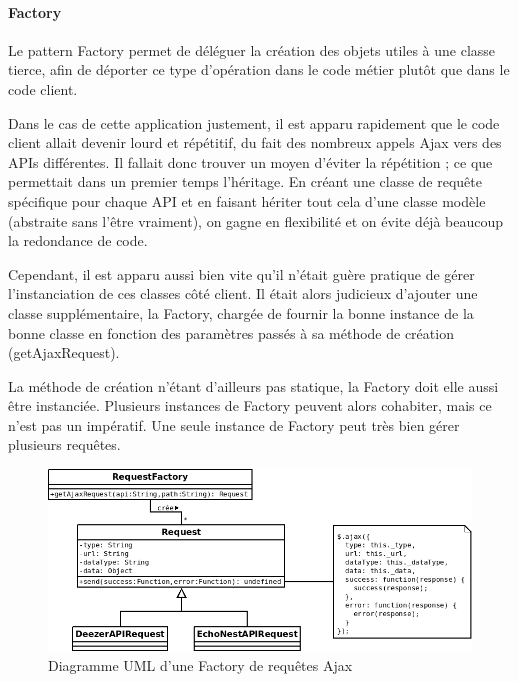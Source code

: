 \documentclass[a4paper,12pt]{article}
\begin{document}
\paragraph{Factory}

Le pattern Factory permet de déléguer la création des objets utiles à une classe tierce, afin de déporter ce type d'opération dans le code métier plutôt que dans le code client.

Dans le cas de cette application justement, il est apparu rapidement que le code client allait devenir lourd et répétitif, du fait des nombreux appels Ajax vers des APIs différentes. Il fallait donc trouver un moyen d'éviter la répétition ; ce que permettait dans un premier temps l'héritage. En créant une classe de requête spécifique pour chaque API et en faisant hériter tout cela d'une classe modèle (abstraite sans l'être vraiment), on gagne en flexibilité et on évite déjà beaucoup la redondance de code.

Cependant, il est apparu aussi bien vite qu'il n'était guère pratique de gérer l'instanciation de ces classes côté client. Il était alors judicieux d'ajouter une classe supplémentaire, la Factory, chargée de fournir la bonne instance de la bonne classe en fonction des paramètres passés à sa méthode de création (getAjaxRequest).

La méthode de création n'étant d'ailleurs pas statique, la Factory doit elle aussi être instanciée. Plusieurs instances de Factory peuvent alors cohabiter, mais ce n'est pas un impératif. Une seule instance de Factory peut très bien gérer plusieurs requêtes.

\begin{figure}[!h]
  \begin{center}
    \includegraphics[scale=0.5]{Factory.png}
    \caption{Diagramme UML d'une Factory de requêtes Ajax}
  \end{center}
\end{figure}
\end{document}
